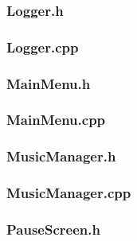 \documentclass{article}
\begin{document}
\subsubsection{Logger.h}
	 
	 				
\subsubsection{Logger.cpp}
	
	 				
\subsubsection{MainMenu.h}
	

\subsubsection{MainMenu.cpp}
		 
 				
\subsubsection{MusicManager.h}
	
	 				
\subsubsection{MusicManager.cpp}
	
	 				
\subsubsection{PauseScreen.h}
	 
	 				
\end{document}
